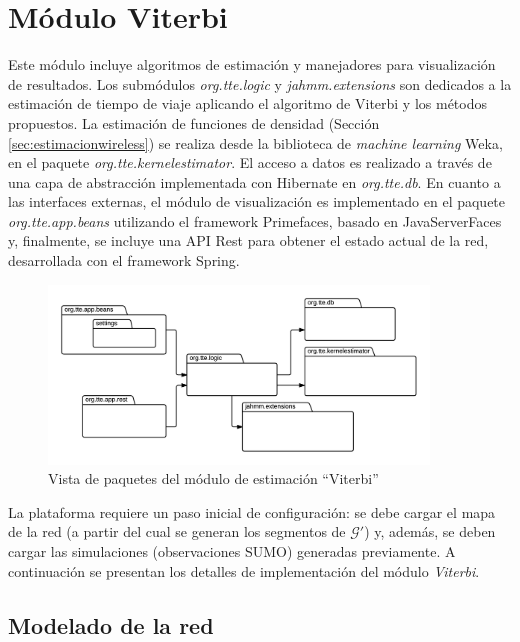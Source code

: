 \section{Módulo Viterbi}\label{sec:viterbi}

Este módulo incluye algoritmos de estimación y manejadores para visualización de resultados. Los submódulos \textit{org.tte.logic} y \textit{jahmm.extensions} son dedicados a la estimación de tiempo de viaje aplicando el algoritmo de Viterbi y los métodos propuestos. La estimación de funciones de densidad (Sección \ref{sec:estimacionwireless}) se realiza desde la biblioteca de \textit{machine learning} Weka, en el paquete \textit{org.tte.kernelestimator}. El acceso a datos es realizado a través de una capa de abstracción implementada con Hibernate en \textit{org.tte.db}. En cuanto a las interfaces externas, el módulo de visualización es implementado en el paquete \textit{org.tte.app.beans} utilizando el framework Primefaces, basado en JavaServerFaces y, finalmente, se incluye una API Rest para obtener el estado actual de la red, desarrollada con el framework Spring.

\begin{figure}[!htp]
	\centering
	\includegraphics[width=0.9\textwidth]{images/modulos-viterbi.png}
	\caption{Vista de paquetes del módulo de estimación ``Viterbi''}
    \label{fig:cyc-estimacion}
\end{figure}

 La plataforma requiere un paso inicial de configuración: se debe cargar el mapa de la red (a partir del cual se generan los segmentos de $\mathcal{G'}$) y, además, se deben cargar las simulaciones (observaciones SUMO) generadas previamente. A continuación se presentan los detalles de implementación del módulo \textit{Viterbi}.

\subsection{Modelado de la red}

